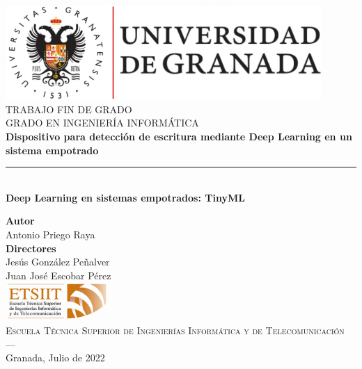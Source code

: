 \begin{titlepage}
 
 
\newlength{\centeroffset}
\setlength{\centeroffset}{-0.5\oddsidemargin}
\addtolength{\centeroffset}{0.5\evensidemargin}
\thispagestyle{empty}

\noindent\hspace*{\centeroffset}\begin{minipage}{\textwidth}

\centering
\includegraphics[width=0.9\textwidth]{imagenes/logo_ugr_mod.jpg}\\[1.4cm]

\textsc{ \Large TRABAJO FIN DE GRADO\\[0.2cm]}
\textsc{ GRADO EN INGENIERÍA INFORMÁTICA}\\[1cm]
% 
{\Huge\bfseries Dispositivo para detección de escritura mediante Deep Learning en
un sistema empotrado\\
}
\noindent\rule[-1ex]{\textwidth}{3pt}\\[3.5ex]
{\large\bfseries Deep Learning en sistemas empotrados: TinyML}
\end{minipage}

\vspace{1.1cm}
\noindent\hspace*{\centeroffset}\begin{minipage}{\textwidth}
\centering

\textbf{Autor}\\ {Antonio Priego Raya}\\[2ex]
\textbf{Directores}\\
{Jesús González Peñalver\\
Juan José Escobar Pérez}\\[1.0cm]
\includegraphics[width=0.3\textwidth]{imagenes/etsiit_logo.png}\\[0.1cm]
\textsc{Escuela Técnica Superior de Ingenierías Informática y de Telecomunicación}\\
\textsc{---}\\
Granada, Julio de 2022
\end{minipage}
\end{titlepage}


